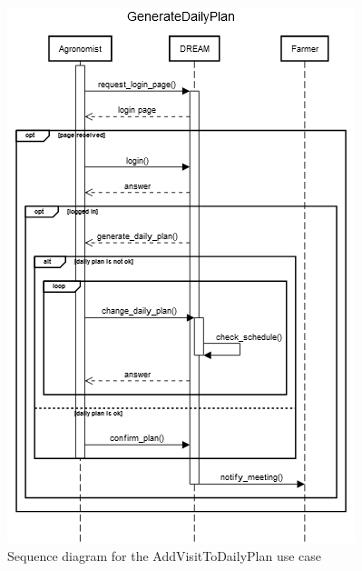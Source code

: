 \documentclass{article}
\begin{document}
\begin{figure}[H]
    \centering
    \includegraphics[scale=0.75]{sequence_diagrams/GenerateDailyPlan}
    \caption{Sequence diagram for the AddVisitToDailyPlan use case}
\end{figure}

\end{document}
